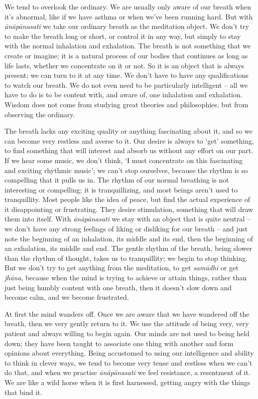 
We tend to overlook the ordinary. We are usually only aware of our breath when it's abnormal, like if we have asthma or when we've been running hard. But with \textit{\=an\=ap\=anasati} we take our ordinary breath as the meditation object. We don't try to make the breath long or short, or control it in any way, but simply to stay with the normal inhalation and exhalation. The breath is not something that we create or imagine; it is a natural process of our bodies that continues as long as life lasts, whether we concentrate on it or not. So it is an object that is always present; we can turn to it at any time. We don't have to have any qualifications to watch our breath. We do not even need to be particularly intelligent -- all we have to do is to be content with, and aware of, one inhalation and exhalation. Wisdom does not come from studying great theories and philosophies, but from observing the ordinary.

The breath lacks any exciting quality or anything fascinating about it, and so we can become very restless and averse to it. Our desire is always to `get' something, to find something that will interest and absorb us without any effort on our part. If we hear some music, we don't think, `I must concentrate on this fascinating and exciting rhythmic music'; we can't stop ourselves, because the rhythm is so compelling that it pulls us in. The rhythm of our normal breathing is not interesting or compelling; it is tranquillizing, and most beings aren't used to tranquillity. Most people like the idea of peace, but find the actual experience of it disappointing or frustrating. They desire stimulation, something that will draw them into itself. With \textit{\=an\=ap\=anasati} we stay with an object that is quite neutral -- we don't have any strong feelings of liking or disliking for our breath -- and just note the beginning of an inhalation, its middle and its end, then the beginning of an exhalation, its middle and end. The gentle rhythm of the breath, being slower than the rhythm of thought, takes us to tranquillity; we begin to stop thinking. But we don't try to get anything from the meditation, to get \textit{sam\=adhi} or get \textit{jh\=ana}, because when the mind is trying to achieve or attain things, rather than just being humbly content with one breath, then it doesn't slow down and become calm, and we become frustrated.

At first the mind wanders off. Once we are aware that we have wandered off the breath, then we very gently return to it. We use the attitude of being very, very patient and always willing to begin again. Our minds are not used to being held down; they have been taught to associate one thing with another and form opinions about everything. Being accustomed to using our intelligence and ability to think in clever ways, we tend to become very tense and restless when we can't do that, and when we practise \textit{\=an\=ap\=anasati} we feel resistance, a resentment of it. We are like a wild horse when it is first harnessed, getting angry with the things that bind it.

